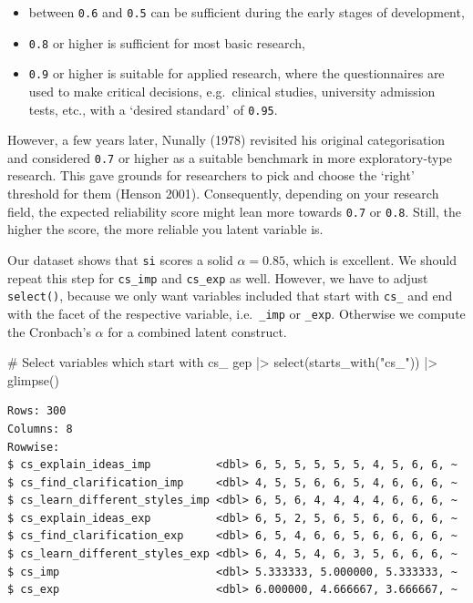 \documentclass[
  letterpaper,
]{krantz}
\makeatletter
\newenvironment{Shaded}{\begin{snugshade}}{\end{snugshade}}
\newcommand{\CommentTok}[1]{\textcolor[rgb]{0.37,0.37,0.37}{#1}}
\newcommand{\FunctionTok}[1]{\textcolor[rgb]{0.28,0.35,0.67}{#1}}
\newcommand{\NormalTok}[1]{\textcolor[rgb]{0.00,0.23,0.31}{#1}}
\newcommand{\SpecialCharTok}[1]{\textcolor[rgb]{0.37,0.37,0.37}{#1}}
\newcommand{\StringTok}[1]{\textcolor[rgb]{0.13,0.47,0.30}{#1}}
\newenvironment{kframe}{%
\medskip{}
\setlength{\fboxsep}{.8em}
 \def\at@end@of@kframe{}%
 \ifinner\ifhmode%
  \def\at@end@of@kframe{\end{minipage}}%
  \begin{minipage}{\columnwidth}%
 \fi\fi%
 \def\FrameCommand##1{\hskip\@totalleftmargin \hskip-\fboxsep
 \colorbox{shadecolor}{##1}\hskip-\fboxsep
     \hskip-\linewidth \hskip-\@totalleftmargin \hskip\columnwidth}%
 \MakeFramed {\advance\hsize-\width
   \@totalleftmargin\z@ \linewidth\hsize
   \@setminipage}}%
 {\par\unskip\endMakeFramed%
 \at@end@of@kframe}
\renewenvironment{Shaded}{\begin{kframe}}{\end{kframe}}
\makeatother
\begin{document}
\begin{itemize}
\item
  between \texttt{0.6} and \texttt{0.5} can be sufficient during the
  early stages of development,
\item
  \texttt{0.8} or higher is sufficient for most basic research,
\item
  \texttt{0.9} or higher is suitable for applied research, where the
  questionnaires are used to make critical decisions, e.g.~clinical
  studies, university admission tests, etc., with a `desired standard'
  of \texttt{0.95}.
\end{itemize}

However, a few years later, Nunally (1978) revisited his original
categorisation and considered \texttt{0.7} or higher as a suitable
benchmark in more exploratory-type research. This gave grounds for
researchers to pick and choose the `right' threshold for them (Henson
2001). Consequently, depending on your research field, the expected
reliability score might lean more towards \texttt{0.7} or \texttt{0.8}.
Still, the higher the score, the more reliable you latent variable is.

Our dataset shows that \texttt{si} scores a solid \(\alpha = 0.85\),
which is excellent. We should repeat this step for \texttt{cs\_imp} and
\texttt{cs\_exp} as well. However, we have to adjust \texttt{select()},
because we only want variables included that start with \texttt{cs\_}
and end with the facet of the respective variable, i.e.~\texttt{\_imp}
or \texttt{\_exp}. Otherwise we compute the Cronbach's \(\alpha\) for a
combined latent construct.

\begin{Shaded}
\begin{Highlighting}[]
\CommentTok{\# Select variables which start with \textquotesingle{}cs\_\textquotesingle{}}
\NormalTok{gep }\SpecialCharTok{|\textgreater{}}
  \FunctionTok{select}\NormalTok{(}\FunctionTok{starts\_with}\NormalTok{(}\StringTok{"cs\_"}\NormalTok{)) }\SpecialCharTok{|\textgreater{}}
  \FunctionTok{glimpse}\NormalTok{()}
\end{Highlighting}
\end{Shaded}

\begin{verbatim}
Rows: 300
Columns: 8
Rowwise: 
$ cs_explain_ideas_imp          <dbl> 6, 5, 5, 5, 5, 5, 4, 5, 6, 6, ~
$ cs_find_clarification_imp     <dbl> 4, 5, 5, 6, 6, 5, 4, 6, 6, 6, ~
$ cs_learn_different_styles_imp <dbl> 6, 5, 6, 4, 4, 4, 4, 6, 6, 6, ~
$ cs_explain_ideas_exp          <dbl> 6, 5, 2, 5, 6, 5, 6, 6, 6, 6, ~
$ cs_find_clarification_exp     <dbl> 6, 5, 4, 6, 6, 5, 6, 6, 6, 6, ~
$ cs_learn_different_styles_exp <dbl> 6, 4, 5, 4, 6, 3, 5, 6, 6, 6, ~
$ cs_imp                        <dbl> 5.333333, 5.000000, 5.333333, ~
$ cs_exp                        <dbl> 6.000000, 4.666667, 3.666667, ~
\end{verbatim}
\end{document}
